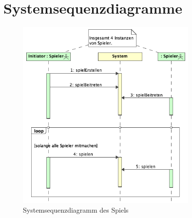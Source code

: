 \documentclass[a4paper,12pt,halfparskip,DIV14]{scrartcl}
\begin{document}
\section{Systemsequenzdiagramme}\label{cha:systemsequenzdiagramme} %
\begin{figure}
	[htp] \centering 
	\includegraphics[width=0.8\textwidth]{SystemSequenzDiagramm.png} \caption{Systemsequenzdiagramm des Spiels}\label{fig:SystemSequenzDiagramm.png} 
\end{figure}
\end{document}
